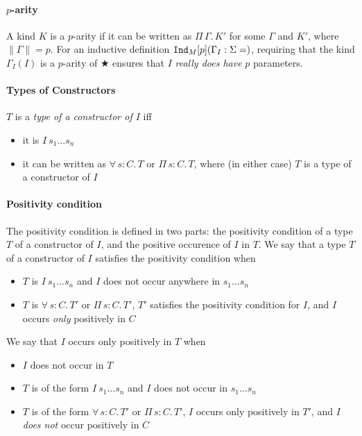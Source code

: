 \documentclass{article}
\newcommand{\abs}[4]{{#1}\, #2\! : \! #3.\, #4}
\newcommand{\absu}[3]{{#1}\, #2.\, #3}
\newcommand{\indast}[5]{\texttt{Ind}_{#1} [#2] (#3 : #4 = #5)}
\newcommand{\lenc}[1]{\|#1\|}
\newcommand{\piforall}{^{\Pi}_{\forall}}
\begin{document}
\paragraph{$p$-arity}

A kind $K$ is a $p$-arity if it can be written as $\absu{\Pi}{\Gamma}{K'}$ for
some $\Gamma$ and $K'$, where $\lenc{\Gamma} = p$. For an inductive definition
$\indast{M}{p}{\Gamma_I}{\Sigma}$, requiring that the kind $\Gamma_{I}(I)$ is a $p$-arity
of ★ ensures that $I$ \textit{really does have} $p$ parameters.

\paragraph{Types of Constructors}
$T$ is a \textit{type of a constructor of $I$} iff
\begin{itemize}
\item it is $I\ s_1 ... s_n$
\item it can be written as $\abs{\forall}{s}{C}{T}$ or $\abs{\Pi}{s}{C}{T}$,
  where (in either case) $T$ is a type of a constructor of $I$
\end{itemize}

\paragraph{Positivity condition}
The positivity condition is defined in two parts: the positivity condition of
a type $T$ of a constructor of $I$, and the positive occurence of $I$ in $T$.
We say that a type $T$ of a constructor of $I$ satisfies the positivity condition
when

\begin{itemize}
\item $T$ is $I\ s_1... s_n$ and $I$ does not occur anywhere in $s_1...s_n$
\item $T$ is $\abs{\forall}{s}{C}{T'}$ or $\abs{\Pi}{s}{C}{T'}$, $T'$ satisfies
  the positivity condition for $I$, and $I$ occurs \textit{only} positively in $C$ 
\end{itemize}

\noindent We say that $I$ occurs only positively in $T$ when
\begin{itemize}
\item $I$ does not occur in $T$
\item $T$ is of the form $I\ s_1 ... s_n$ and $I$ does not occur in $s_1 ...
  s_n$
\item $T$ is of the form $\abs{\forall}{s}{C}{T'}$ or $\abs{\Pi}{s}{C}{T'}$, $I$
  occurs only positively in $T'$, and $I$ \textit{does not} occur positively in $C$
\end{itemize}
\end{document}
